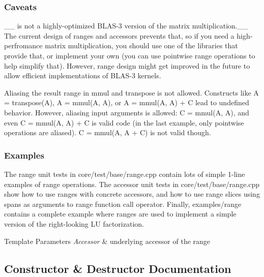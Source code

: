 \subsubsection*{Caveats }

\+\_\+\+\_ is not a highly-\/optimized B\+L\+A\+S-\/3 version of the matrix multiplication.\+\_\+\+\_\+ The current design of ranges and accessors prevents that, so if you need a high-\/perfromance matrix multiplication, you should use one of the libraries that provide that, or implement your own (you can use pointwise range operations to help simplify that). However, range design might get improved in the future to allow efficient implementations of B\+L\+A\+S-\/3 kernels.

Aliasing the result range in {\ttfamily mmul} and {\ttfamily transpose} is not allowed. Constructs like {\ttfamily A = transpose(\+A)}, {\ttfamily A = mmul(\+A, A)}, or {\ttfamily A = mmul(\+A, A) + C} lead to undefined behavior. However, aliasing input arguments is allowed\+: {\ttfamily C = mmul(\+A, A)}, and even {\ttfamily C = mmul(\+A, A) + C} is valid code (in the last example, only pointwise operations are aliased). {\ttfamily C = mmul(A, A + C)} is not valid though.

\subsubsection*{Examples }

The range unit tests in core/test/base/range.\+cpp contain lots of simple 1-\/line examples of range operations. The accessor unit tests in core/test/base/range.\+cpp show how to use ranges with concrete accessors, and how to use range slices using {\ttfamily span}s as arguments to range function call operator. Finally, examples/range contains a complete example where ranges are used to implement a simple version of the right-\/looking LU factorization.


\begin{DoxyTemplParams}{Template Parameters}
{\em Accessor} & underlying accessor of the range \\
\hline
\end{DoxyTemplParams}


\subsection{Constructor \& Destructor Documentation}
\mbox{\label{classgko_1_1range_a906b09927f171491b605dd62e8723d98}} 
